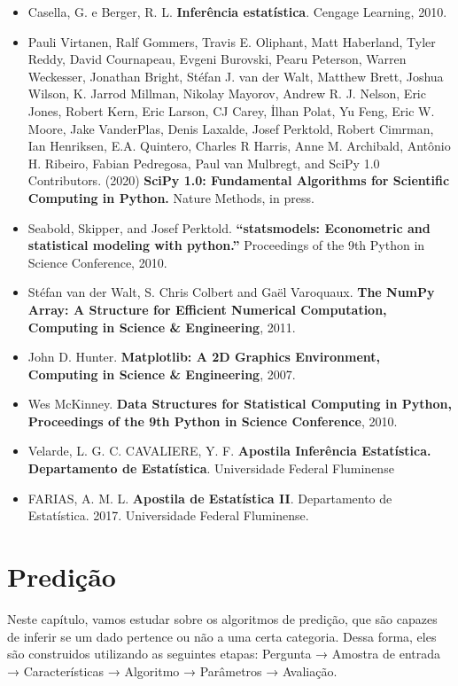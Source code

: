 \documentclass[
  letterpaper,
  DIV=11,
  numbers=noendperiod]{scrreprt}
\providecommand{\tightlist}{%
  \setlength{\itemsep}{0pt}\setlength{\parskip}{0pt}}\usepackage{longtable,booktabs,array}
\begin{document}
\begin{itemize}
\tightlist
\item
  Casella, G. e Berger, R. L. \textbf{Inferência estatística}. Cengage
  Learning, 2010.
\item
  Pauli Virtanen, Ralf Gommers, Travis E. Oliphant, Matt Haberland,
  Tyler Reddy, David Cournapeau, Evgeni Burovski, Pearu Peterson, Warren
  Weckesser, Jonathan Bright, Stéfan J. van der Walt, Matthew Brett,
  Joshua Wilson, K. Jarrod Millman, Nikolay Mayorov, Andrew R. J.
  Nelson, Eric Jones, Robert Kern, Eric Larson, CJ Carey, İlhan Polat,
  Yu Feng, Eric W. Moore, Jake VanderPlas, Denis Laxalde, Josef
  Perktold, Robert Cimrman, Ian Henriksen, E.A. Quintero, Charles R
  Harris, Anne M. Archibald, Antônio H. Ribeiro, Fabian Pedregosa, Paul
  van Mulbregt, and SciPy 1.0 Contributors. (2020) \textbf{SciPy 1.0:
  Fundamental Algorithms for Scientific Computing in Python.} Nature
  Methods, in press.
\item
  Seabold, Skipper, and Josef Perktold. \textbf{``statsmodels:
  Econometric and statistical modeling with python.''} Proceedings of
  the 9th Python in Science Conference, 2010.
\item
  Stéfan van der Walt, S. Chris Colbert and Gaël Varoquaux. \textbf{The
  NumPy Array: A Structure for Efficient Numerical Computation,
  Computing in Science \& Engineering}, 2011.
\item
  John D. Hunter. \textbf{Matplotlib: A 2D Graphics Environment,
  Computing in Science \& Engineering}, 2007.
\item
  Wes McKinney. \textbf{Data Structures for Statistical Computing in
  Python, Proceedings of the 9th Python in Science Conference}, 2010.
\item
  Velarde, L. G. C. CAVALIERE, Y. F. \textbf{Apostila Inferência
  Estatística. Departamento de Estatística}. Universidade Federal
  Fluminense
\item
  FARIAS, A. M. L. \textbf{Apostila de Estatística II}. Departamento de
  Estatística. 2017. Universidade Federal Fluminense.
\end{itemize}


\hypertarget{prediuxe7uxe3o}{%
\chapter{Predição}\label{prediuxe7uxe3o}}

Neste capítulo, vamos estudar sobre os algoritmos de predição, que são
capazes de inferir se um dado pertence ou não a uma certa categoria.
Dessa forma, eles são construidos utilizando as seguintes etapas:
Pergunta → Amostra de entrada → Características → Algoritmo → Parâmetros
→ Avaliação.
\end{document}

